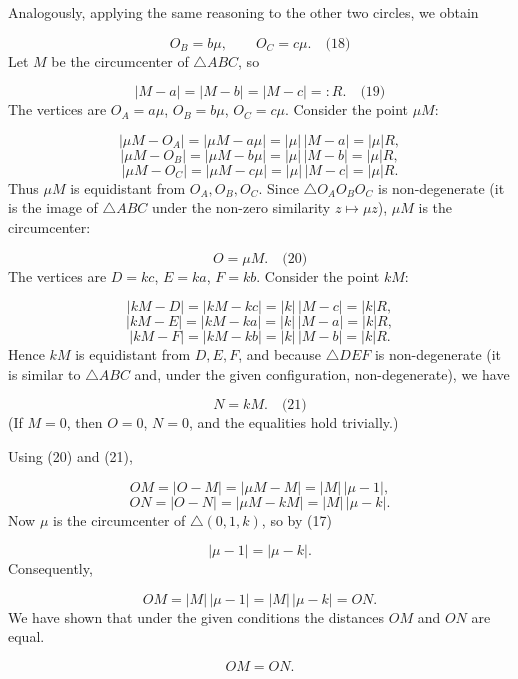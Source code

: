 Analogously, applying the same reasoning to the other two circles, we obtain\par
\[
O_B = b \mu,\qquad O_C = c \mu. \quad\text{(18)}
\]
\smallskip
{}
Let \(M\) be the circumcenter of \(\triangle ABC\), so\par
\[
|M - a| = |M - b| = |M - c| =: R. \quad\text{(19)}
\]
The vertices are \(O_A = a\mu\), \(O_B = b\mu\), \(O_C = c\mu\). Consider the point \(\mu M\):\par
\[
|\mu M - O_A| = |\mu M - a\mu| = |\mu|\,|M - a| = |\mu| R,
\]
\[
|\mu M - O_B| = |\mu M - b\mu| = |\mu|\,|M - b| = |\mu| R,
\]
\[
|\mu M - O_C| = |\mu M - c\mu| = |\mu|\,|M - c| = |\mu| R.
\]
Thus \(\mu M\) is equidistant from \(O_A,O_B,O_C\). Since \(\triangle O_A O_B O_C\) is non-degenerate (it is the image of \(\triangle ABC\) under the non-zero similarity \(z \mapsto \mu z\)), \(\mu M\) is the circumcenter:\par
\[
O = \mu M. \quad\text{(20)}
\]
The vertices are \(D = k c\), \(E = k a\), \(F = k b\). Consider the point \(k M\):\par
\[
|k M - D| = |k M - k c| = |k|\,|M - c| = |k| R,
\]
\[
|k M - E| = |k M - k a| = |k|\,|M - a| = |k| R,
\]
\[
|k M - F| = |k M - k b| = |k|\,|M - b| = |k| R.
\]
Hence \(k M\) is equidistant from \(D,E,F\), and because \(\triangle DEF\) is non-degenerate (it is similar to \(\triangle ABC\) and, under the given configuration, non-degenerate), we have\par
\[
N = k M. \quad\text{(21)}
\]
(If \(M = 0\), then \(O = 0\), \(N = 0\), and the equalities hold trivially.)\par
\smallskip
{}
Using (20) and (21),\par
\[
OM = |O - M| = |\mu M - M| = |M|\,|\mu - 1|,
\]
\[
ON = |O - N| = |\mu M - k M| = |M|\,|\mu - k|.
\]
Now \(\mu\) is the circumcenter of \(\triangle (0,1,k)\), so by (17)\par
\[
|\mu - 1| = |\mu - k|.
\]
Consequently,\par
\[
OM = |M|\,|\mu - 1| = |M|\,|\mu - k| = ON.
\]
\smallskip
{}
We have shown that under the given conditions the distances \(OM\) and \(ON\) are equal.\par
\[
\boxed{OM = ON}.
\]
\par

